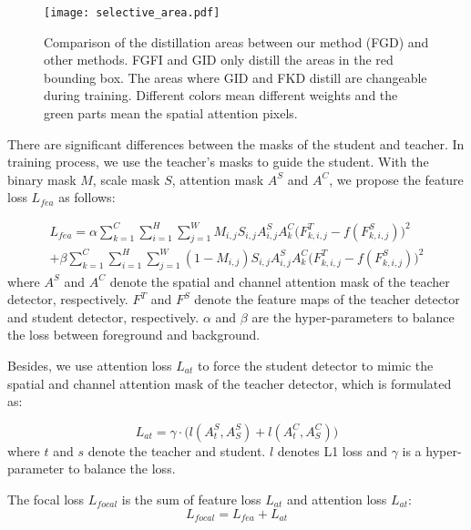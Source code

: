 \documentclass[10pt,twocolumn,letterpaper]{article}
\begin{document}
\begin{figure}
  \centering
  \texttt{[image: selective\_area.pdf]}
  \caption{Comparison of the distillation areas between our method (FGD) and other methods. FGFI and GID only distill the areas in the red bounding box. The areas where GID and FKD distill are changeable during training. Different colors mean different weights and the green parts mean the spatial attention pixels.}
  \label{figure:selective area}
\end{figure}

There are significant differences between the masks of the student and teacher. In training process, we use the teacher's masks to guide the student. With the binary mask $M$, scale mask $S$, attention mask $A^{S}$ and $A^{C}$, we propose the feature loss $L_{fea}$ as follows:

\begin{equation}
    \label{l-decoupled}
    \begin{split}
        L_{fea}=\alpha\sum_{k=1}^{C}\sum_{i=1}^{H}\sum_{j=1}^{W} M_{i,j} S_{i,j} A_{i,j}^{S} A_{k}^{C}\big( F_{k,i,j}^{T}-f(F_{k,i,j}^{S})\big)^{2} \\
        + \beta\sum_{k=1}^{C}\sum_{i=1}^{H}\sum_{j=1}^{W} (1-M_{i,j}) S_{i,j} A_{i,j}^{S} A_{k}^{C}\big( F_{k,i,j}^{T}-f(F_{k,i,j}^{S})\big)^{2}
    \end{split}
\end{equation}
where $A^{S}$ and $A^{C}$ denote the spatial and channel attention mask of the teacher detector, respectively. $F^{T}$ and $F^{S}$ denote the feature maps of the teacher detector and student detector, respectively. $\alpha$ and $\beta$ are the hyper-parameters to balance the loss between foreground and background.

Besides, we use attention loss $L_{at}$ to force the student detector to mimic the spatial and channel attention mask of the teacher detector, which is formulated as:

\begin{equation}
    \label{l-attention}
        L_{at}=\gamma\cdot \big(l(A_{t}^{S}, A_{S}^{S}) + l(A_{t}^{C}, A_{S}^{C})\big)
\end{equation}
where $t$ and $s$ denote the teacher and student. $l$ denotes L1 loss and $\gamma$ is a  hyper-parameter to balance the loss.

The focal loss $L_{focal}$ is the sum of feature loss $L_{at}$ and attention loss $L_{at}$:
\begin{equation}
    \label{l-focal}
        L_{focal}= L_{fea} +  L_{at}
\end{equation}
\end{document}
